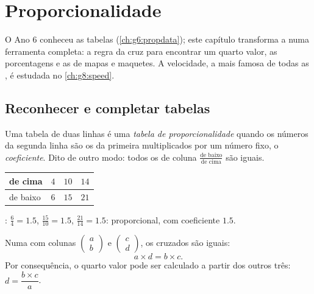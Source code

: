 \chapter{Proporcionalidade}\label{ch:g7:prop}

O Ano 6 conheceu as tabelas  (\cref{ch:g6:propdata});
este capítulo transforma a  numa ferramenta completa:
a regra da cruz para encontrar um quarto valor, as porcentagens e as
 de mapas e maquetes. A velocidade, a mais famosa de todas as
, é estudada no \cref{ch:g8:speed}.

\section{Reconhecer e completar tabelas}

\begin{definition}\label{def:g7:prop:table}
Uma tabela de duas linhas é uma \emph{tabela de
proporcionalidade} quando os números da
segunda linha são os da primeira multiplicados por um número fixo, o
\emph{coeficiente}. Dito de outro modo: todos os  de coluna
$\frac{\text{de baixo}}{\text{de cima}}$ são iguais.
\end{definition}

\begin{example}\label{ex:g7:prop:recognize}
\begin{center}
\renewcommand{\arraystretch}{1.3}
\begin{tabular}{l|ccc}
de cima & $4$ & $10$ & $14$ \\
\hline
de baixo & $6$ & $15$ & $21$ \\
\end{tabular}
\end{center}
: $\frac64 = 1.5$, $\frac{15}{10} = 1.5$,
$\frac{21}{14} = 1.5$: proporcional, com coeficiente $1.5$.
\end{example}

\begin{theorem}\label{thm:g7:prop:cross}
Numa  com colunas $\begin{pmatrix} a \\ b
\end{pmatrix}$ e $\begin{pmatrix} c \\ d \end{pmatrix}$, os 
cruzados são iguais:
\[
a \times d = b \times c .
\]
Por consequência, o quarto valor pode ser calculado a partir dos outros
três: $d = \dfrac{b \times c}{a}$.
\end{theorem}

